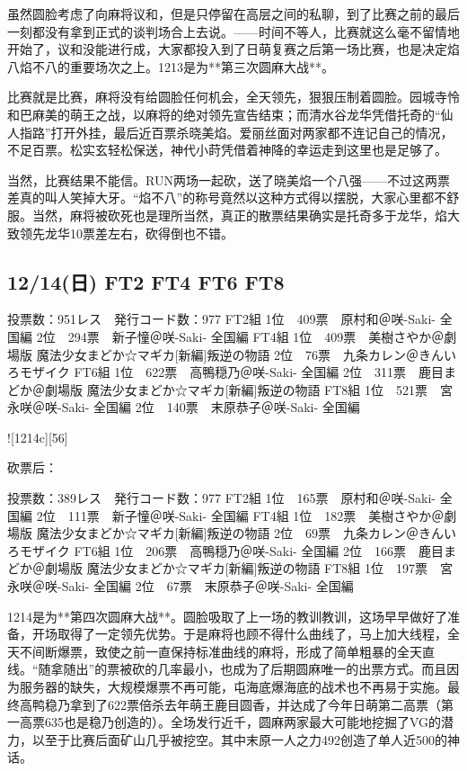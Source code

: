 虽然圆脸考虑了向麻将议和，但是只停留在高层之间的私聊，到了比赛之前的最后一刻都没有拿到正式的谈判场合上去说。——时间不等人，比赛就这么毫不留情地开始了，议和没能进行成，大家都投入到了日萌复赛之后第一场比赛，也是决定焰八焰不八的重要场次之上。1213是为**第三次圆麻大战**。

比赛就是比赛，麻将没有给圆脸任何机会，全天领先，狠狠压制着圆脸。园城寺怜和巴麻美的萌王之战，以麻将的绝对领先宣告结束；而清水谷龙华凭借托奇的“仙人指路”打开外挂，最后近百票杀晓美焰。爱丽丝面对两家都不连记自己的情况，不足百票。松实玄轻松保送，神代小莳凭借着神降的幸运走到这里也是足够了。

当然，比赛结果不能信。RUN两场一起砍，送了晓美焰一个八强——不过这两票差真的叫人笑掉大牙。“焰不八”的称号竟然以这种方式得以摆脱，大家心里都不舒服。当然，麻将被砍死也是理所当然，真正的散票结果确实是托奇多于龙华，焰大致领先龙华10票差左右，砍得倒也不错。

\subsection{12/14(日) FT2 FT4 FT6 FT8}

	投票数：951レス　発行コード数：977
	FT2組
	1位　409票　原村和＠咲-Saki- 全国編
	2位　294票　新子憧＠咲-Saki- 全国編
	FT4組
	1位　409票　美樹さやか＠劇場版 魔法少女まどか☆マギカ[新編]叛逆の物語
	2位　76票　九条カレン＠きんいろモザイク
	FT6組
	1位　622票　高鴨穏乃＠咲-Saki- 全国編
	2位　311票　鹿目まどか＠劇場版 魔法少女まどか☆マギカ[新編]叛逆の物語
	FT8組
	1位　521票　宮永咲＠咲-Saki- 全国編
	2位　140票　末原恭子＠咲-Saki- 全国編

![1214c][56]

砍票后：

	投票数：389レス　発行コード数：977
	FT2組
	1位　165票　原村和＠咲-Saki- 全国編
	2位　111票　新子憧＠咲-Saki- 全国編
	FT4組
	1位　182票　美樹さやか＠劇場版 魔法少女まどか☆マギカ[新編]叛逆の物語
	2位　69票　九条カレン＠きんいろモザイク
	FT6組
	1位　206票　高鴨穏乃＠咲-Saki- 全国編
	2位　166票　鹿目まどか＠劇場版 魔法少女まどか☆マギカ[新編]叛逆の物語
	FT8組
	1位　197票　宮永咲＠咲-Saki- 全国編
	2位　67票　末原恭子＠咲-Saki- 全国編

1214是为**第四次圆麻大战**。圆脸吸取了上一场的教训教训，这场早早做好了准备，开场取得了一定领先优势。于是麻将也顾不得什么曲线了，马上加大线程，全天不间断爆票，致使之前一直保持标准曲线的麻将，形成了简单粗暴的全天直线。“随拿随出”的票被砍的几率最小，也成为了后期圆麻唯一的出票方式。而且因为服务器的缺失，大规模爆票不再可能，屯海底爆海底的战术也不再易于实施。最终高鸭稳乃拿到了622票倍杀去年萌王鹿目圆香，并达成了今年日萌第二高票（第一高票635也是稳乃创造的）。全场发行近千，圆麻两家最大可能地挖掘了VG的潜力，以至于比赛后面矿山几乎被挖空。其中末原一人之力492创造了单人近500的神话。

